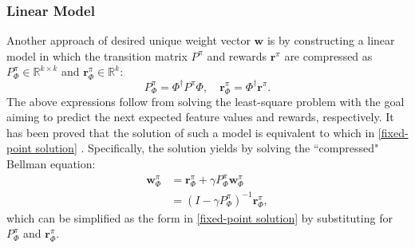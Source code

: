 \documentclass[onecolumn, conference]{IEEEtran}
\begin{document}
\subsubsection{Linear Model} Another approach of desired unique weight vector $\boldsymbol{w}$ is by constructing a linear model in which the transition matrix $P^{\pi}$ and rewards $\boldsymbol{r}^\pi$ are compressed as $P^{\pi}_\Phi \in \mathbb{R}^{k\times k}$ and $\boldsymbol{r}^{\pi}_\Phi\in \mathbb{R}^{k}$:
	\begin{equation}\label{compress P}
		P^{\pi}_\Phi = \Phi^{\dagger}P^\pi\Phi, \quad \boldsymbol{r}^{\pi}_\Phi = \Phi^{\dagger}\boldsymbol{r}^{\pi}.
	\end{equation}
	The above expressions follow from solving the least-square problem with the goal aiming to predict the next expected feature values and rewards, respectively. It has been proved that the solution of such a model is equivalent to which in \eqref{fixed-point solution} \cite{Parr2008AnAO}. Specifically, the solution yields by solving the “compressed" Bellman equation:
	\begin{equation}
		\begin{split}
			\boldsymbol{w}_\Phi^\pi &= \boldsymbol{r}_\Phi^\pi + \gamma P_{\Phi}^{\pi}\boldsymbol{w}_\Phi^\pi\\
			&=(I - \gamma P_{\Phi}^{\pi})^{-1} \boldsymbol{r}_\Phi^\pi,
		\end{split}
	\end{equation} 
	which can be simplified as the form in \eqref{fixed-point solution} by substituting for $P_{\Phi}^{\pi}$ and $\boldsymbol{r}_\Phi^\pi$.
\end{document}
